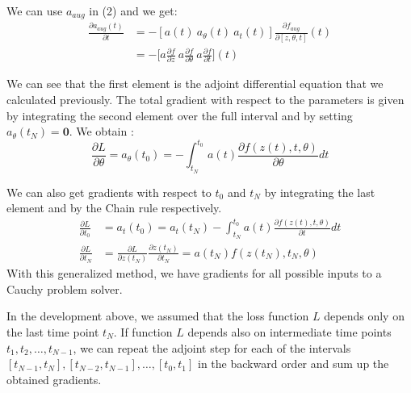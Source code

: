 \documentclass[10pt,a4paper]{article}
\theoremstyle{definition}
\theoremstyle{definition}
\theoremstyle{definition}
\begin{document}
We can use $a_{aug}$ in (2) and we get:
\begin{align*}
\frac{\partial a_{aug}(t)}{\partial t} 
&= - [a(t) \ a_\theta (t) \ a_t (t)]\frac{\partial f_{aug}}{\partial [ z,\theta , t]}(t) \\
&= -\Big[a\frac{\partial f}{\partial z} \ a\frac{\partial f}{\partial \theta} \ a\frac{\partial  f}{\partial t}\Big] (t)
\end{align*}

We can see that the first element is the adjoint differential equation that we calculated previously. The total gradient with respect to the parameters is given by integrating the second element over the full interval and by setting $a_\theta (t_N) = \textbf{0}$. We obtain :
$$
\frac{\partial L}{\partial \theta} = a_\theta (t_0) = - \int_{t_N}^{t_0} a(t) \frac{\partial f(z(t),t,\theta)}{\partial \theta} dt
$$

We can also get gradients with respect to $t_0$ and $t_N$ by integrating the last element and by the Chain rule respectively.
\begin{align*}
\frac{\partial L}{\partial t_0} &= a_t(t_0) = a_t(t_N) - \int_{t_N}^{t_0} a(t) \frac{\partial f(z(t),t,\theta)}{\partial t} dt \\
\frac{\partial L}{\partial t_N} &= \frac{\partial L}{\partial z(t_N)} \frac{\partial z(t_N)}{\partial t_N} = a(t_N)f(z(t_N),t_N,\theta)
\end{align*}
With this generalized method, we have gradients for all possible inputs to a Cauchy problem solver.



In the development above, we assumed that the loss function $L$ depends only on the last time point $t_N$. If function $L$ depends also on intermediate time points $t_1, t_2, \dots , t_{N-1}$, we can repeat the adjoint step for each of the intervals $[t_{N-1}, t_N ],[t_{N-2}, t_{N-1}], \dots , [t_0,t_1]$ in the backward order and sum up the obtained gradients.
\end{document}
